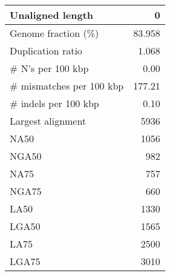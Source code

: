 \documentclass[12pt,a4paper]{article}
\begin{document}
\begin{table}[ht]
\begin{center}
\begin{tabular}{|l*{1}{|r}|}
Unaligned length & 0 \\ \hline
Genome fraction (\%) & 83.958 \\ \hline
Duplication ratio & 1.068 \\ \hline
\# N's per 100 kbp & 0.00 \\ \hline
\# mismatches per 100 kbp & 177.21 \\ \hline
\# indels per 100 kbp & 0.10 \\ \hline
Largest alignment & 5936 \\ \hline
NA50 & 1056 \\ \hline
NGA50 & 982 \\ \hline
NA75 & 757 \\ \hline
NGA75 & 660 \\ \hline
LA50 & 1330 \\ \hline
LGA50 & 1565 \\ \hline
LA75 & 2500 \\ \hline
LGA75 & 3010 \\ \hline
\end{tabular}
\end{center}
\end{table}
\end{document}
